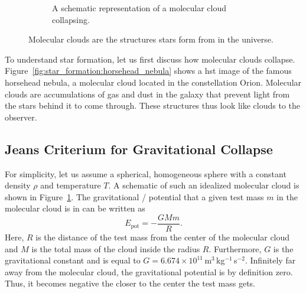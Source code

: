 \begin{figure}[tb]
\begin{subfigure}{0.459\textwidth}
        \caption{A schematic representation of a molecular cloud collapsing.}
        \label{fig:star_formation:cloud_collapse_schematic}
    \end{subfigure}
    \caption{Molecular clouds are the structures stars form from in the universe.}
    \label{fig:star_formation:molecular_clouds}
\end{figure}
To understand star formation, let us first discuss how molecular clouds collapse. Figure~\ref{fig:star_formation:horsehead_nebula} shows a \ac{hst} image of the famous horsehead nebula, a molecular cloud located in the constellation Orion. Molecular clouds are accumulations of gas and dust in the galaxy that prevent light from the stars behind it to come through. These structures thus look like clouds to the observer.

\subsection{Jeans Criterium for Gravitational Collapse}

For simplicity, let us assume a spherical, homogeneous sphere with a constant density $\rho$ and temperature $T$. A schematic of such an idealized molecular cloud is shown in Figure~\ref{fig:star_formation:cloud_collapse_schematic}. The gravitational / potential that a given test mass $m$ in the molecular cloud is in can be written as
\begin{equation}
    E_\mathrm{pot} = -\frac{GMm}{R}.\label{eqn:star_formation:potential_energy}
\end{equation}
Here, $R$ is the distance of the test mass from the center of the molecular cloud and $M$ is the total mass of the cloud inside the radius $R$. Furthermore, $G$ is the gravitational constant and is equal to $G=6.674 \times 10^{11}$\,m$^{3}$\,kg$^{-1}$\,s$^{-2}$. Infinitely far away from the molecular cloud, the gravitational potential is by definition zero. Thus, it becomes negative the closer to the center the test mass gets. 

